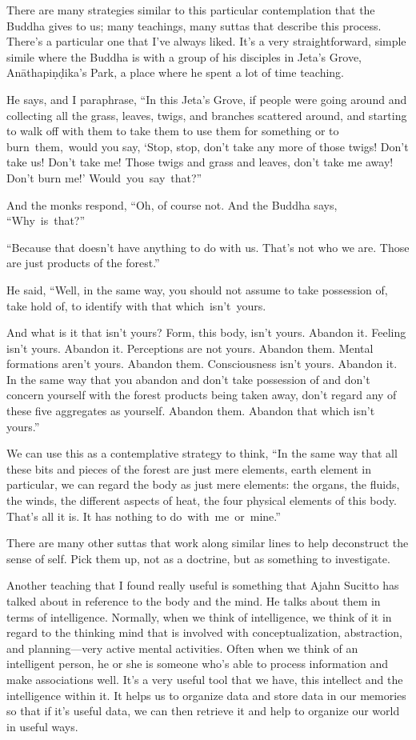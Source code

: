 There are many strategies similar to this particular contemplation that the Buddha gives to us; many teachings, many suttas that describe this process. There's a particular one that I've always liked. It's a very straightforward, simple simile where the Buddha is with a group of his disciples in Jeta's Grove, Anāthapiṇḍika's Park, a place where he spent a lot of time teaching.

He says, and I paraphrase, ``In this Jeta's Grove, if people were going around and collecting all the grass, leaves, twigs, and branches scattered around, and starting to walk off with them to take them to use them for something or to \mbox{burn them, would} you say, `Stop, stop, don't take any more of those twigs! Don't take us! Don't take me! Those twigs and grass and leaves, don't take me away! Don't burn me!' \mbox{Would you say that?''}


And the monks respond, ``Oh, of course not. And the Buddha says, \mbox{``Why is that?''}

``Because that doesn't have anything to do with us. That's not who we are. Those are just products of the forest.''

\enlargethispage{1\baselineskip}
He said, ``Well, in the same way, you should not assume to take possession of, take hold of, to identify with that \mbox{which isn't yours.}

And what is it that isn't yours? Form, this body, isn't yours. Abandon it. Feeling isn't yours. Abandon it. Perceptions are not yours. Abandon them. Mental formations aren't yours. Abandon them. Consciousness isn't yours. Abandon it. In the same way that you abandon and don't take possession of and don't concern yourself with the forest products being taken away, don't regard any of these five aggregates as yourself. Abandon them. Abandon that which isn't yours.''

We can use this as a contemplative strategy to think, ``In the same way that all these bits and pieces of the forest are just mere elements, earth element in particular, we can regard the body as just mere elements: the organs, the fluids, the winds, the different aspects of heat, the four physical elements of this body. That's all it is. It has nothing to \mbox{do with me or mine.''}

There are many other suttas that work along similar lines to help deconstruct the sense of self. Pick them up, not as a doctrine, but as something to investigate.

Another teaching that I found really useful is something that Ajahn Sucitto has talked about in reference to the body and the mind. He talks about them in terms of intelligence. Normally, when we think of intelligence, we think of it in regard to the thinking mind that is involved with conceptualization, abstraction, and planning---very active mental activities. Often when we think of an intelligent person, he or she is someone who's able to process information and make associations well. It's a very useful tool that we have, this intellect and the intelligence within it. It helps us to organize data and store data in our memories so that if it's useful data, we can then retrieve it and help to organize our world in useful ways.

